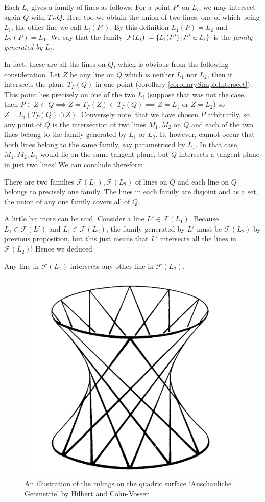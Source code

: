 Each $L_i$ gives a family of lines as follows: For a point $P'$ on $L_i$, we may intersect again $Q$ with $T_{P'}Q$.
Here too we obtain the union of two lines, one of which being $L_i$, the other line we call $L_i(P')$.
By this definition $L_1(P) = L_2$ and $L_2(P) = L_1$.
We say that the family $\mathcal F(L_i) := \left\lbrace L_i(P') \,|\, P' \in L_i\right\rbrace$ is the \emph{family generated by $L_i$}.

In fact, these are all the lines on $Q$, which is obvious from the following consideration.
Let $Z$ be any line on $Q$ which is neither $L_1$ nor $L_2$, then it intersects the plane $T_P(Q)$ in one point (corollary \ref{corollarySimpleIntersect}).
This point lies precisely on one of the two $L_i$ (suppose that was not the case, then $P \in Z \subset Q \implies Z = T_P(Z) \subset T_P(Q) \implies Z=L_1 \text{ or } Z=L_2$) so $Z = L_i(T_P(Q)\cap Z)$.
Conversely note, that we have chosen $P$ arbitrarily, so any point of $Q$ is the intersection of two lines $M_1,M_2$ on $Q$ and each of the two lines belong to the family generated by $L_1$ or $L_2$.
It, however, cannot occur that both lines belong to the same family, say parametrised by $L_1$. In that case, $M_1,M_2,L_1$ would lie on the same tangent plane, but $Q$ intersects a tangent plane in just two lines!
We can conclude therefore:
\begin{proposition}
There are two families $\mathcal F(L_1), \mathcal F(L_2)$ of lines on $Q$ and each line on $Q$ belongs to precisely one family.
The lines in each family are disjoint and as a set, the union of any one family covers all of $Q$.
\end{proposition}
A little bit more can be said.
Consider a line $L' \in \mathcal F(L_1)$.
Because $L_1 \in \mathcal F(L')$ and $L_1 \in \mathcal F(L_2)$, the family generated by $L'$ must be $\mathcal F(L_2)$ by previous proposition, but this just means that $L'$ intersects all the lines in $\mathcal F(L_2)$!
Hence we deduced
\begin{corollary} \label{corollaryMutualIntersect}
Any line in $\mathcal F(L_1)$ intersects any other line in $\mathcal F(L_2)$.
\end{corollary}

\begin{figure}
\center
\includegraphics[width=.4\textwidth]{img/ruledsurface-hilbert.png}
\caption{An illustration of the rulings on the quadric surface `Anschauliche Geometrie' by Hilbert and Cohn-Vossen \cite[figure 17]{cohn1990geometry}}
\end{figure}

